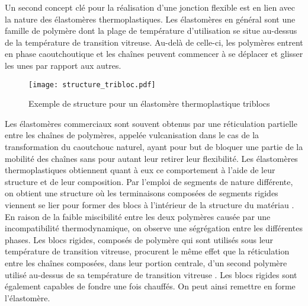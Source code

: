 \newcommand\setpolymerdelim[2]{\def\delimleft{#1}\def\delimright{#2}}
\def\makebraces[#1,#2]#3#4#5{%
	\edef\delimhalfdim{\the\dimexpr(#1+#2)/2}%
	\edef\delimvshift{\the\dimexpr(#1-#2)/2}%
	\chemmove{%
		\node[at=(#4),yshift=(\delimvshift)]
		{$\left\delimleft\vrule height\delimhalfdim depth\delimhalfdim
			width0pt\right.$};%
		\node[at=(#5),yshift=(\delimvshift)]
		{$\left.\vrule height\delimhalfdim depth\delimhalfdim
			width0pt\right\delimright_{\rlap{$\scriptstyle#3$}}$};}}
\setpolymerdelim()

Un second concept clé pour la réalisation d'une jonction flexible est en lien avec la nature des élastomères thermoplastiques. 
Les élastomères en général sont une famille de polymère dont la plage de température d'utilisation se situe au-dessus de la température de transition vitreuse. 
Au-delà de celle-ci, les polymères entrent en phase caoutchoutique et les chaînes peuvent commencer à se déplacer et glisser les unes par rapport aux autres. 

\begin{figure}[h]
	\centering
	\texttt{[image: structure\_tribloc.pdf]}
	\caption{Exemple de structure pour un élastomère thermoplastique triblocs}
	\label{fig:structure_tribloc}
\end{figure}

Les élastomères commerciaux sont souvent obtenus par une réticulation partielle entre les chaînes de polymères, appelée vulcanisation dans le cas de la transformation du  caoutchouc naturel, ayant pour but de bloquer une partie de la mobilité des chaînes sans pour autant leur retirer leur flexibilité. 
Les élastomères thermoplastiques obtiennent quant à eux ce comportement à l'aide de leur structure et de leur composition. 
Par l'emploi de segments de nature différente, on obtient une structure où les terminaisons composées de segments rigides viennent se lier pour former des blocs à l'intérieur de la structure du matériau \cite{Holden1969}. 
En raison de la faible miscibilité entre les deux polymères causée par une incompatibilité thermodynamique, on observe une ségrégation entre les différentes phases. 
Les blocs rigides, composés de polymère qui sont utilisés sous leur température de transition vitreuse, procurent le même effet que la réticulation entre les chaînes composées, dans leur portion centrale, d'un second polymère utilisé au-dessus de sa température de transition vitreuse \cite{Holden2002}. 
Les blocs rigides sont également capables de fondre une fois chauffés.
On peut ainsi remettre en forme l'élastomère. 

